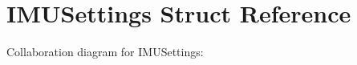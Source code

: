 \hypertarget{structIMUSettings}{}\section{I\+M\+U\+Settings Struct Reference}
\label{structIMUSettings}


Collaboration diagram for I\+M\+U\+Settings\+:
